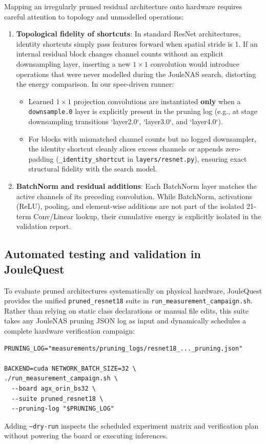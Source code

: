 Mapping an irregularly pruned residual architecture onto hardware requires careful attention to topology and unmodelled operations:
\begin{enumerate}
    \item \textbf{Topological fidelity of shortcuts}: In standard ResNet architectures, identity shortcuts simply pass features forward when spatial stride is 1. If an internal residual block changes channel counts without an explicit downsampling layer, inserting a new $1 \times 1$ convolution would introduce operations that were never modelled during the JouleNAS search, distorting the energy comparison. In our spec-driven runner:
    \begin{itemize}
        \item Learned $1 \times 1$ projection convolutions are instantiated \textbf{only} when a \texttt{downsample.0} layer is explicitly present in the pruning log (e.g., at stage downsampling transitions `layer2.0`, `layer3.0`, and `layer4.0`).
        \item For blocks with mismatched channel counts but no logged downsampler, the identity shortcut cleanly slices excess channels or appends zero-padding (\texttt{\_identity\_}\allowbreak\texttt{shortcut} in \texttt{layers/resnet.py}), ensuring exact structural fidelity with the search model.
    \end{itemize}
    \item \textbf{BatchNorm and residual additions}: Each BatchNorm layer matches the active channels of its preceding convolution. While BatchNorm, activations (ReLU), pooling, and element-wise additions are not part of the isolated 21-term Conv/Linear lookup, their cumulative energy is explicitly isolated in the validation report.
\end{enumerate}

\subsection{Automated testing and validation in JouleQuest}

To evaluate pruned architectures systematically on physical hardware, JouleQuest provides the unified \texttt{pruned\_resnet18} suite in \texttt{run\_measurement\_campaign.sh}. Rather than relying on static class declarations or manual file edits, this suite takes any JouleNAS pruning JSON log as input and dynamically schedules a complete hardware verification campaign:
\begin{lstlisting}
PRUNING_LOG="measurements/pruning_logs/resnet18_..._pruning.json"

BACKEND=cuda NETWORK_BATCH_SIZE=32 \
./run_measurement_campaign.sh \
  --board agx_orin_bs32 \
  --suite pruned_resnet18 \
  --pruning-log "$PRUNING_LOG"
\end{lstlisting}
Adding \texttt{--dry-run} inspects the scheduled experiment matrix and verification plan without powering the board or executing inferences.

